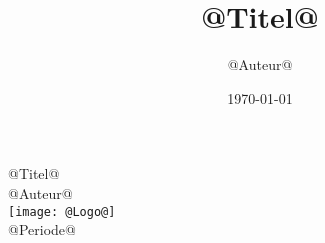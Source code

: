 \documentclass[twocolumn,a4paper,10pt]{report}
\title{@Titel@}
\author{@Auteur@}
\date{\today{}}
\begin{document}
\begin{titlepage}
  \begin{center}
    \huge @Titel@ \\
    \vspace{1in}
    \large @Auteur@ \\
    \vspace{2in}
    \texttt{[image: @Logo@]} \\
    \vspace{1in}
    \large @Periode@ \\
  \end{center}
\end{titlepage}

\begin{landscape}
  \begin{center}
  \end{center}
\end{landscape}
\newpage
\end{document}
